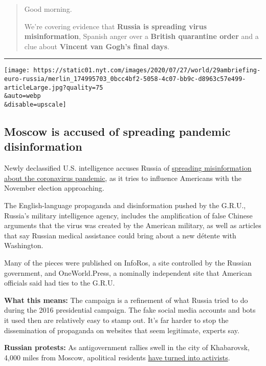 \begin{quote}
Good morning.

We're covering evidence that \textbf{Russia is spreading virus
misinformation}, Spanish anger over a \textbf{British quarantine order}
and a clue about \textbf{Vincent van Gogh's final days}.
\end{quote}

\begin{center}\rule{0.5\linewidth}{\linethickness}\end{center}

\texttt{[image: https://static01.nyt.com/images/2020/07/27/world/29ambriefing-euro-russia/merlin\_174995703\_0bcc4bf2-5058-4c07-bb9c-d8963c57e499-articleLarge.jpg?quality=75\\\&auto=webp\\\&disable=upscale]}

\hypertarget{moscow-is-accused-of-spreading-pandemic-disinformation}{%
\subsection{Moscow is accused of spreading pandemic
disinformation}\label{moscow-is-accused-of-spreading-pandemic-disinformation}}

Newly declassified U.S. intelligence accuses Russia of
\href{https://www.nytimes.com/2020/07/28/us/politics/russia-disinformation-coronavirus.html}{spreading
misinformation about the coronavirus pandemic}, as it tries to influence
Americans with the November election approaching.

The English-language propaganda and disinformation pushed by the G.R.U.,
Russia's military intelligence agency, includes the amplification of
false Chinese arguments that the virus was created by the American
military, as well as articles that say Russian medical assistance could
bring about a new détente with Washington.

Many of the pieces were published on InfoRos, a site controlled by the
Russian government, and OneWorld.Press, a nominally independent site
that American officials said had ties to the G.R.U.

\textbf{What this means:} The campaign is a refinement of what Russia
tried to do during the 2016 presidential campaign. The fake social media
accounts and bots it used then are relatively easy to stamp out. It's
far harder to stop the dissemination of propaganda on websites that seem
legitimate, experts say.

\textbf{Russian protests:} As antigovernment rallies swell in the city
of Khabarovsk, 4,000 miles from Moscow, apolitical residents
\href{https://www.nytimes.com/2020/07/28/world/europe/russias-far-east-protests-putin.html}{have
turned into activists}.

